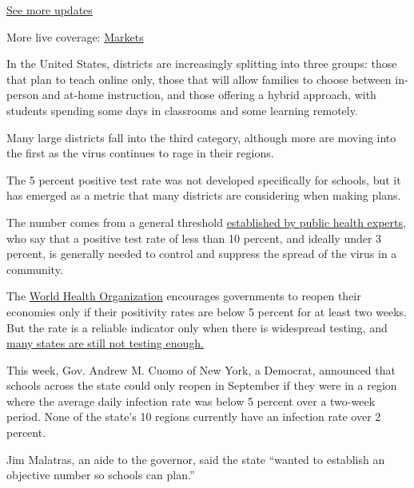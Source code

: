 \href{https://www.nytimes3xbfgragh.onion/2020/08/04/world/coronavirus-covid-19.html?action=click\&pgtype=Article\&state=default\&region=MAIN_CONTENT_1\&context=storylines_live_updates}{See
more updates}

More live coverage:
\href{https://www.nytimes3xbfgragh.onion/live/2020/08/03/business/stock-market-today-coronavirus?action=click\&pgtype=Article\&state=default\&region=MAIN_CONTENT_1\&context=storylines_live_updates}{Markets}

In the United States, districts are increasingly splitting into three
groups: those that plan to teach online only, those that will allow
families to choose between in-person and at-home instruction, and those
offering a hybrid approach, with students spending some days in
classrooms and some learning remotely.

Many large districts fall into the third category, although more are
moving into the first as the virus continues to rage in their regions.

The 5 percent positive test rate was not developed specifically for
schools, but it has emerged as a metric that many districts are
considering when making plans.

The number comes from a general threshold
\href{https://globalepidemics.org/wp-content/uploads/2020/06/key_metrics_and_indicators_v4.pdf}{established
by public health experts}, who say that a positive test rate of less
than 10 percent, and ideally under 3 percent, is generally needed to
control and suppress the spread of the virus in a community.

The \href{https://coronavirus.jhu.edu/testing/testing-positivity}{World
Health Organization} encourages governments to reopen their economies
only if their positivity rates are below 5 percent for at least two
weeks. But the rate is a reliable indicator only when there is
widespread testing, and
\href{https://www.nytimes3xbfgragh.onion/interactive/2020/us/coronavirus-testing.html}{many
states are still not testing enough.}

This week, Gov. Andrew M. Cuomo of New York, a Democrat, announced that
schools across the state could only reopen in September if they were in
a region where the average daily infection rate was below 5 percent over
a two-week period. None of the state's 10 regions currently have an
infection rate over 2 percent.

Jim Malatras, an aide to the governor, said the state ``wanted to
establish an objective number so schools can plan.''

